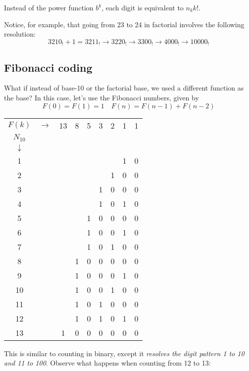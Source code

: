 \documentclass{article}
\begin{document}
\noindent Instead of the power function $b^k$, each digit is equivalent to $n_k k!$. 

\noindent Notice, for example, that going from 23 to 24 in factorial involves the following resolution: \begin{equation} 3210_! + 1 = 3211_! \rightarrow 3220_! \rightarrow 3300_! \rightarrow 4000_! \rightarrow 10000_!\end{equation}

\subsection{Fibonacci coding}

\noindent What if instead of base-10 or the factorial base, we used a different function as the base? In this case, let's use the Fibonacci numbers, given by \begin{equation}F(0) = F(1) = 1 \quad F(n) = F(n-1) + F(n-2)\end{equation}

\begin{center}
\begin{tabular} {c c c c c c c c c}
$F(k)$ & $\rightarrow$ & 13 & 8 & 5 & 3 & 2 & 1 & 1 \\
$N_{10}$\\
$\downarrow$\\
1 & & & & & & & 1 & 0\\
2 & & & & & & 1 & 0 & 0\\
3 & & & & & 1 & 0 & 0 & 0\\
4 & & & & & 1 & 0 & 1 & 0\\
5 & & & & 1 & 0 & 0 & 0 & 0\\
6 & & & & 1 & 0 & 0 & 1 & 0\\
7 & & & & 1 & 0 & 1 & 0 & 0\\
8 & & & 1 & 0 & 0 & 0 & 0 & 0\\
9 & & & 1 & 0 & 0 & 0 & 1 & 0\\
10 & & & 1 & 0 & 0 & 1 & 0 & 0\\
11 & & & 1 & 0 & 1 & 0 & 0 & 0\\
12 & & & 1 & 0 & 1 & 0 & 1 & 0\\
13 & & 1 & 0 & 0 & 0 & 0 & 0 & 0\\
\end{tabular}
\end{center}

\noindent This is similar to counting in binary, except it \textit{resolves the digit pattern 1 to 10 and 11 to 100}. Observe what happens when counting from 12 to 13:
\end{document}
